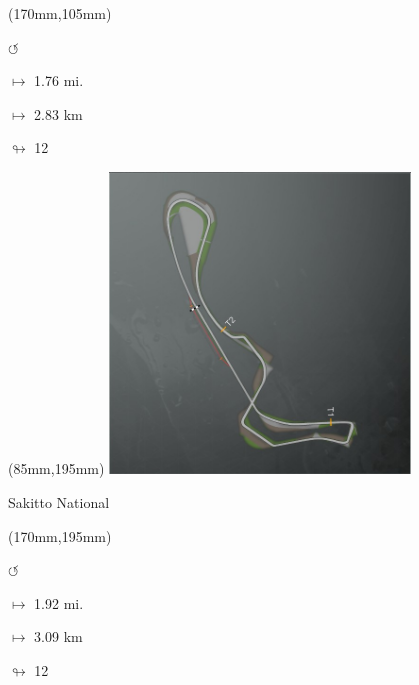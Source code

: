 \begin{textblock*}{30mm}(170mm,105mm)%
\par \Huge$\circlearrowleft$
\Large
\par$\mapsto$ 1.76 mi.
\par$\mapsto$ 2.83 km
\par$\looparrowright$ 12
\end{textblock*}
\begin{textblock*}{80mm}(85mm,195mm)%
\includegraphics[width=80mm]{TR/2015-05-20_00054.png}
\centerline{Sakitto National}
\end{textblock*}
\begin{textblock*}{30mm}(170mm,195mm)%
\par \Huge$\circlearrowleft$
\Large
\par$\mapsto$ 1.92 mi.
\par$\mapsto$ 3.09 km
\par$\looparrowright$ 12
\end{textblock*}
\null\newpage

